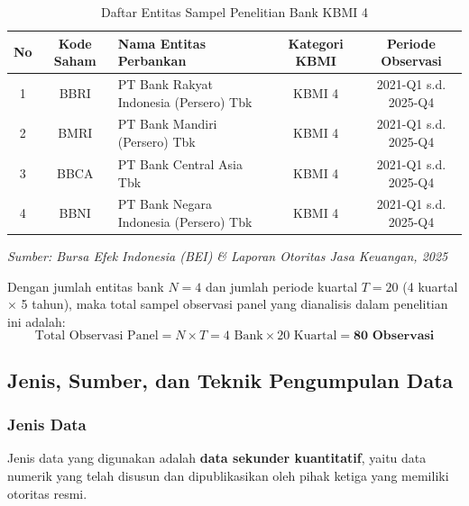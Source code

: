 \documentclass[12pt,a4paper]{article}
\numberwithin{equation}{section}
\begin{document}
\begin{table}[H]
  \caption{Daftar Entitas Sampel Penelitian Bank KBMI 4}
  \label{tab:sampel_penelitian}
  \begin{tabularx}{\textwidth}{|c|c|>{\raggedright\arraybackslash}X|c|c|}
    \hline
    \textbf{No} & \textbf{Kode Saham} & \textbf{Nama Entitas Perbankan} & \textbf{Kategori KBMI} & \textbf{Periode Observasi} \\
    \hline
    1 & BBRI & PT Bank Rakyat Indonesia (Persero) Tbk & KBMI 4 & 2021-Q1 s.d. 2025-Q4 \\
    \hline
    2 & BMRI & PT Bank Mandiri (Persero) Tbk & KBMI 4 & 2021-Q1 s.d. 2025-Q4 \\
    \hline
    3 & BBCA & PT Bank Central Asia Tbk & KBMI 4 & 2021-Q1 s.d. 2025-Q4 \\
    \hline
    4 & BBNI & PT Bank Negara Indonesia (Persero) Tbk & KBMI 4 & 2021-Q1 s.d. 2025-Q4 \\
    \hline
  \end{tabularx}
  \begin{flushleft}
    \textit{Sumber: Bursa Efek Indonesia (BEI) \& Laporan Otoritas Jasa Keuangan, 2025}
  \end{flushleft}
\end{table}

\noindent
Dengan jumlah entitas bank $N = 4$ dan jumlah periode kuartal $T = 20$ (4 kuartal $\times$ 5 tahun), maka total sampel observasi panel yang dianalisis dalam penelitian ini adalah:
\begin{equation}
  \text{Total Observasi Panel} = N \times T = 4 \text{ Bank} \times 20 \text{ Kuartal} = \mathbf{80 \text{ Observasi}}
\end{equation}

\subsection{Jenis, Sumber, dan Teknik Pengumpulan Data}

\subsubsection{Jenis Data}
\noindent
Jenis data yang digunakan adalah \textbf{data sekunder kuantitatif}, yaitu data numerik yang telah disusun dan dipublikasikan oleh pihak ketiga yang memiliki otoritas resmi.
\end{document}
